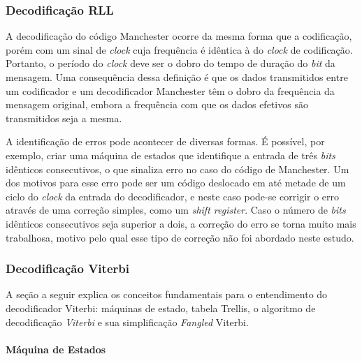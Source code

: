 	\subsubsection{Decodificação RLL}
	
	A decodificação do código Manchester ocorre da mesma forma que a codificação, porém com um sinal de \textit{clock} cuja frequência é idêntica à do \textit{clock} de codificação. Portanto, o período do \textit{clock} deve ser o dobro do tempo de duração do \textit{bit} da mensagem. Uma consequência dessa definição é que os dados transmitidos entre um codificador e um decodificador Manchester têm o dobro da frequência da mensagem original, embora a frequência com que os dados efetivos são transmitidos seja a mesma.
	
	A identificação de erros pode acontecer de diversas formas. É possível, por exemplo, criar uma máquina de estados que identifique a entrada de três \textit{bits} idênticos consecutivos, o que sinaliza erro no caso do código de Manchester. Um dos motivos para esse erro pode ser um código deslocado em até metade de um ciclo do \textit{clock} da entrada do decodificador, e neste caso pode-se corrigir o erro através de uma correção simples, como um \textit{shift register}. Caso o número de \textit{bits} idênticos consecutivos seja superior a dois, a correção do erro se torna muito mais trabalhosa, motivo pelo qual esse tipo de correção não foi abordado neste estudo.
	
	\subsubsection{Decodificação Viterbi}\label{section:method-viterbi}
	
	A seção a seguir explica os conceitos fundamentais para o entendimento do decodificador Viterbi: máquinas de estado, tabela Trellis, o algoritmo de decodificação \textit{Viterbi} e sua simplificação \textit{Fangled} Viterbi.
	
	\paragraph{Máquina de Estados}
	

